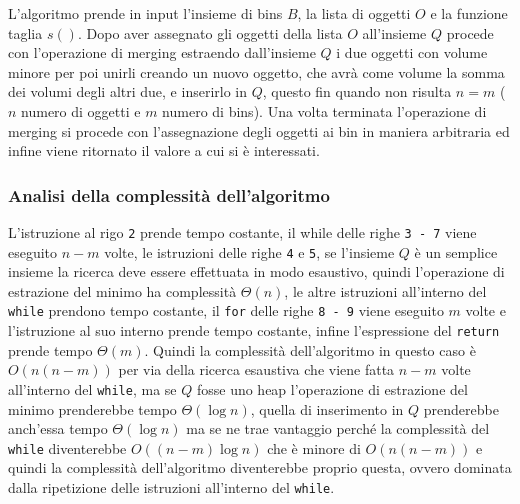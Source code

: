 \noindent
L'algoritmo prende in input l'insieme di bins $ B $, la lista di oggetti $ O $ e la funzione taglia $ s() $. Dopo aver assegnato gli oggetti della lista $ O $
all'insieme $ Q $ procede con l'operazione di merging estraendo dall'insieme $ Q $ i due oggetti con volume minore per poi unirli creando un nuovo oggetto, che
avrà come volume la somma dei volumi degli altri due, e inserirlo in $ Q $, questo fin quando non risulta $ n = m $ ($ n $ numero di oggetti e $ m $ numero di bins). 
Una volta terminata l'operazione di merging si procede con l'assegnazione degli oggetti ai bin in maniera arbitraria ed infine viene ritornato il valore a cui si è interessati.

\subsubsection{Analisi della complessità dell'algoritmo}
L'istruzione al rigo \texttt{2} prende tempo costante, il while delle righe \texttt{3 - 7} viene eseguito 
$ n - m $ volte, le istruzioni delle righe \texttt{4} e \texttt{5}, se l'insieme $ Q $ è un semplice insieme la ricerca deve essere effettuata in modo esaustivo, quindi l'operazione di 
estrazione del minimo ha complessità $ \Theta(n) $, le altre istruzioni all'interno del \texttt{while} prendono tempo costante, il \texttt{for} delle righe \texttt{8 - 9} viene eseguito 
$ m $ volte e l'istruzione al suo interno prende tempo costante, infine l'espressione del \texttt{return} prende tempo $ \Theta(m) $. Quindi la complessità dell'algoritmo
in questo caso è $ O(n(n - m)) $ per via della ricerca esaustiva che viene fatta $ n - m $ volte all'interno del \texttt{while}, ma se $ Q $ fosse uno heap l'operazione di 
estrazione del minimo prenderebbe tempo $ \Theta(\log{}n) $, quella di inserimento in $ Q $ prenderebbe anch'essa tempo $ \Theta(\log{}n) $ ma se ne trae vantaggio
perché la complessità del \texttt{while} diventerebbe $ O((n - m) \log{}n) $ che è minore di $ O(n(n - m)) $ e quindi la complessità dell'algoritmo diventerebbe proprio questa,
ovvero dominata dalla ripetizione delle istruzioni all'interno del \texttt{while}.

